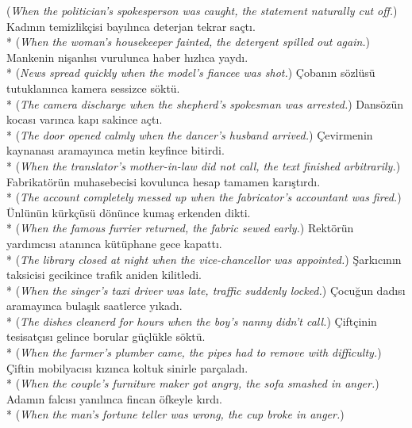 ({\it * When the politician's spokesperson was caught, the statement naturally cut off.})
\ex * Kad{\i}n{\i}n temizlik\c{c}isi bay{\i}l{\i}nca deterjan tekrar sa\c{c}t{\i}.\\*
({\it * When the woman's housekeeper fainted, the detergent spilled out again.})
\ex * Mankenin ni\c{s}anl{\i}s{\i} vurulunca haber h{\i}zl{\i}ca yayd{\i}.\\*
({\it * News spread quickly when the model's fiancee was shot.})
\ex * \c{C}oban{\i}n s\"{o}zl\"{u}s\"{u} tutuklan{\i}nca kamera sessizce s\"{o}kt\"{u}.\\*
({\it * The camera discharge when the shepherd's spokesman was arrested.})
\ex * Dans\"{o}z\"{u}n kocas{\i} var{\i}nca kap{\i} sakince a\c{c}t{\i}.\\*
({\it * The door opened calmly when the dancer's husband arrived.})
\ex * \c{C}evirmenin kaynanas{\i} aramay{\i}nca metin keyfince bitirdi.\\*
({\it * When the translator's mother-in-law did not call, the text finished arbitrarily.})
\ex * Fabrikat\"{o}r\"{u}n muhasebecisi kovulunca hesap tamamen kar{\i}\c{s}t{\i}rd{\i}.\\*
({\it * The account completely messed up when the fabricator's accountant was fired.})
\ex * \"{U}nl\"{u}n\"{u}n k\"{u}rk\c{c}\"{u}s\"{u} d\"{o}n\"{u}nce kuma\c{s} erkenden dikti.\\*
({\it * When the famous furrier returned, the fabric sewed early.})
\ex * Rekt\"{o}r\"{u}n yard{\i}mc{\i}s{\i} atan{\i}nca k\"{u}t\"{u}phane gece kapatt{\i}.\\*
({\it * The library closed at night when the vice-chancellor was appointed.})
\ex * \c{S}ark{\i}c{\i}n{\i}n taksicisi gecikince trafik aniden kilitledi.\\*
({\it * When the singer's taxi driver was late, traffic suddenly locked.})
\ex * \c{C}ocu\u{g}un dad{\i}s{\i} aramay{\i}nca bula\c{s}{\i}k saatlerce y{\i}kad{\i}.\\*
({\it * The dishes cleanerd for hours when the boy's nanny didn't call.})
\ex * \c{C}ift\c{c}inin tesisat\c{c}{\i}s{\i} gelince borular g\"{u}\c{c}l\"{u}kle s\"{o}kt\"{u}.\\*
({\it * When the farmer's plumber came, the pipes had to remove with difficulty.})
\ex * \c{C}iftin mobilyac{\i}s{\i} k{\i}z{\i}nca koltuk sinirle par\c{c}alad{\i}.\\*
({\it * When the couple's furniture maker got angry, the sofa smashed in anger.})
\ex * Adam{\i}n falc{\i}s{\i} yan{\i}l{\i}nca fincan \"{o}fkeyle k{\i}rd{\i}.\\*
({\it * When the man's fortune teller was wrong, the cup broke in anger.})
\z
\z


\newpage
